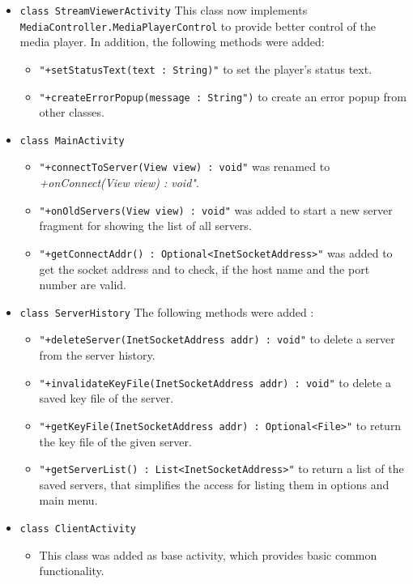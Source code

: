 \documentclass[a4paper,10pt]{scrartcl}
\begin{document}
\begin{itemize}
\item \lstinline|class StreamViewerActivity|
   This class now implements  \lstinline|MediaController.MediaPlayerControl| to provide better
  control of the media player. In addition, the following methods were added:
  \begin{itemize}
   \item \lstinline|"+setStatusText(text : String)"| to set the player's status text.
   \item \lstinline|"+createErrorPopup(message : String")| to create an error popup from other classes.
  \end{itemize}

   \item \lstinline|class MainActivity|
  \begin{itemize}
   \item \lstinline|"+connectToServer(View view) : void"| was renamed to \textit{+onConnect(View view) : void"}.
   \item \lstinline|"+onOldServers(View view) : void"| was added to start a new server fragment for showing the
    list of all servers.
    \item \lstinline|"+getConnectAddr() : Optional<InetSocketAddress>"| was added to get the socket address
    and to check, if the host name and the port number are valid.
  \end{itemize}

  \item \lstinline|class ServerHistory| \newline
  The following methods were added :
  \begin{itemize}
   \item \lstinline|"+deleteServer(InetSocketAddress addr) : void"| to delete a server from the server history.
   \item \lstinline|"+invalidateKeyFile(InetSocketAddress addr) : void"| to delete a saved key file of the server.
   \item \lstinline|"+getKeyFile(InetSocketAddress addr) : Optional<File>"| to return the key file of the given server.
   \item \lstinline|"+getServerList() : List<InetSocketAddress>"| to return a list of the saved servers, that simplifies the access for listing them in options and main menu.
  \end{itemize}

 \item \lstinline|class ClientActivity|
  \begin{itemize}
   \item This class was added as base activity, which provides basic common functionality.
  \end{itemize}


\end{itemize}
\end{document}
